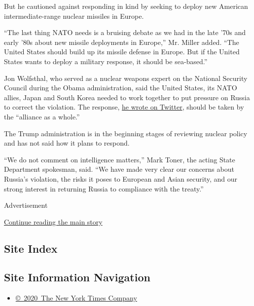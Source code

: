 But he cautioned against responding in kind by seeking to deploy new
American intermediate-range nuclear missiles in Europe.

``The last thing NATO needs is a bruising debate as we had in the late
'70s and early '80s about new missile deployments in Europe,'' Mr.
Miller added. ``The United States should build up its missile defense in
Europe. But if the United States wants to deploy a military response, it
should be sea-based.''

Jon Wolfsthal, who served as a nuclear weapons expert on the National
Security Council during the Obama administration, said the United
States, its NATO allies, Japan and South Korea needed to work together
to put pressure on Russia to correct the violation. The response,
\href{https://twitter.com/JBWolfsthal/status/831585510418157569}{he
wrote on Twitter}, should be taken by the ``alliance as a whole.''

The Trump administration is in the beginning stages of reviewing nuclear
policy and has not said how it plans to respond.

``We do not comment on intelligence matters,'' Mark Toner, the acting
State Department spokesman, said. ``We have made very clear our concerns
about Russia's violation, the risks it poses to European and Asian
security, and our strong interest in returning Russia to compliance with
the treaty.''

Advertisement

\protect\hyperlink{after-bottom}{Continue reading the main story}

\hypertarget{site-index}{%
\subsection{Site Index}\label{site-index}}

\hypertarget{site-information-navigation}{%
\subsection{Site Information
Navigation}\label{site-information-navigation}}

\begin{itemize}
\tightlist
\item
  \href{https://help.nytimes.com/hc/en-us/articles/115014792127-Copyright-notice}{©~2020~The
  New York Times Company}
\end{itemize}

